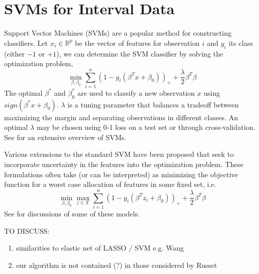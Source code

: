 \documentclass[11pt]{article}
\begin{document}

\section{SVMs for Interval Data}
Support Vector Machines (SVMs) are a popular method for constructing classifiers. Let $x_i \in \mathbb{R}^p$ be the vector of features for observation $i$ and $y_i$ its class (either $-1$ or $+1$), we can determine the SVM classifier by solving the optimization problem,
\begin{equation}
\label{eq:svm}
\min_{\beta,\beta_0}  \sum_{i=1}^n (1 - y_i(\beta^Tx + \beta_0))_{+} + \frac{\lambda}{2}\beta^T\beta
\end{equation}
The optimal $\beta^*$ and $\beta_0^*$ are used to classify a new observation $x$ using $sign(\beta^* x + \beta_0)$. $\lambda$ is a tuning parameter that balances a tradeoff between maximizing the margin and separating observations in different classes. An optimal $\lambda$ may be chosen using 0-1 loss on a test set or through cross-validation. See \cite{scholkopf2002learning} for an extensive overview of SVMs.

Various extensions to the standard SVM have been proposed that seek to incorporate uncertainty in the features into the optimization problem. These formulations often take (or can be interpreted) as minimizing the objective function for a worst case allocation of features in some fixed set, i.e.
\begin{equation}
\label{eq:svm_minimax}
\min_{\beta,\beta_0}  \max_{z \in \mathcal{X}} \sum_{i=1}^n (1 - y_i(\beta^Tz_i + \beta_0))_{+} + \frac{\lambda}{2}\beta^T\beta
\end{equation}
See \cite{bhattacharyya2004robust,shivaswamy2006second,ben2011chance} for discussions of some of these models.



TO DISCUSS:
\begin{enumerate}
\item similarities to elastic net of LASSO / SVM e.g. Wang \cite{wang2007hybrid}
\item our algorithm is not contained (?) in those considered by Russet \cite{rosset2007piecewise}
\end{enumerate}
\end{document}
